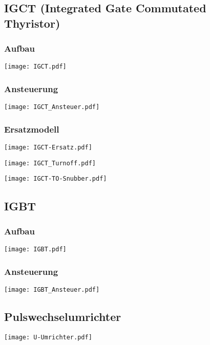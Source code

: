 \documentclass[fs, german]{latex4ei_fs}
\begin{document}
\begin{sectionbox}
\subsection{IGCT (Integrated Gate Commutated Thyristor)}
\subsubsection*{Aufbau}
\texttt{[image: IGCT.pdf]}

\subsubsection*{Ansteuerung}
\texttt{[image: IGCT\_Ansteuer.pdf]}

\subsubsection*{Ersatzmodell}
\texttt{[image: IGCT-Ersatz.pdf]}

\texttt{[image: IGCT\_Turnoff.pdf]}

\texttt{[image: IGCT-TO-Snubber.pdf]}



\end{sectionbox}

\begin{sectionbox}
\subsection{IGBT}
\subsubsection*{Aufbau}
\texttt{[image: IGBT.pdf]}

\subsubsection*{Ansteuerung}
\texttt{[image: IGBT\_Ansteuer.pdf]}

\end{sectionbox}

\begin{sectionbox}
\subsection{Pulswechselumrichter}
\texttt{[image: U-Umrichter.pdf]}

\end{sectionbox}
\end{document}
